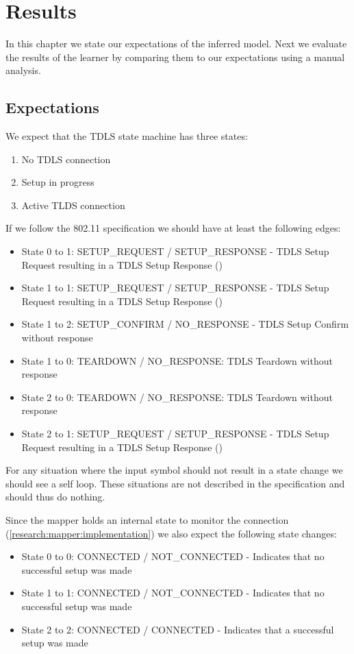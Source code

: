 \chapter{Results}

In this chapter we state our expectations of the inferred model. Next we evaluate the results of the learner by comparing them to our expectations using a manual analysis.

\section{Expectations}

We expect that the TDLS state machine has three states:
\begin{enumerate}
	\item No TDLS connection
	\item Setup in progress
	\item Active TLDS connection
\end{enumerate}

If we follow the 802.11 specification we should have at least the following edges:
\begin{itemize}
	\item State 0 to 1: SETUP\_REQUEST / SETUP\_RESPONSE - TDLS Setup Request resulting in a TDLS Setup Response (\cite[11.23.4]{80211})
	\item State 1 to 1: SETUP\_REQUEST / SETUP\_RESPONSE - TDLS Setup Request resulting in a TDLS Setup Response (\cite[11.23.4]{80211})
	\item State 1 to 2: SETUP\_CONFIRM / NO\_RESPONSE - TDLS Setup Confirm without response
	\item State 1 to 0: TEARDOWN / NO\_RESPONSE: TDLS Teardown without response
	\item State 2 to 0: TEARDOWN / NO\_RESPONSE: TDLS Teardown without response
	\item State 2 to 1: SETUP\_REQUEST / SETUP\_RESPONSE - TDLS Setup Request resulting in a TDLS Setup Response (\cite[11.23.4 sub e]{80211})
\end{itemize}

For any situation where the input symbol should not result in a state change we should see a self loop. These situations are not described in the specification and should thus do nothing.

Since the mapper holds an internal state to monitor the connection (\ref{research:mapper:implementation}) we also expect the following state changes:
\begin{itemize}
	\item State 0 to 0: CONNECTED / NOT\_CONNECTED - Indicates that no successful setup was made
	\item State 1 to 1: CONNECTED / NOT\_CONNECTED - Indicates that no successful setup was made
	\item State 2 to 2: CONNECTED / CONNECTED - Indicates that a successful setup was made
\end{itemize}

